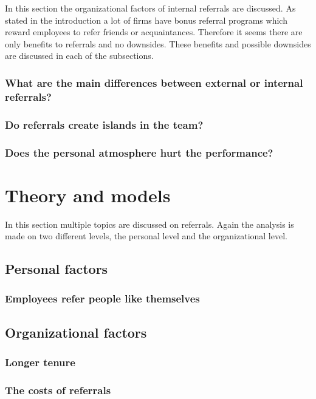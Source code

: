 \documentclass[a4paper, 11pt]{article} %
\begin{document}
In this section the organizational factors of internal referrals are discussed. As stated in the introduction a lot of firms have bonus referral programs which reward employees to refer friends or acquaintances. Therefore it seems there are only benefits to referrals and no downsides. These benefits and possible downsides are discussed in each of the subsections.

\subsubsection*{What are the main differences between external or internal referrals?}
\subsubsection*{Do referrals create islands in the team?}
\subsubsection*{Does the personal atmosphere hurt the performance?}

\section*{Theory and models}
In this section multiple topics are discussed on referrals. Again the analysis is made on two different levels, the personal level and the organizational level. 

\subsection{Personal factors}

\subsubsection{Employees refer people like themselves}

\subsection{Organizational factors}

\subsubsection{Longer tenure}
\subsubsection{The costs of referrals}
\end{document}
